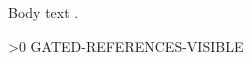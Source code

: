 \documentclass{article}
\newcounter{cite}
\begin{document}
Body text \cite{foo}.

\ifnum\value{cite}>0
GATED-REFERENCES-VISIBLE
\fi
\end{document}
